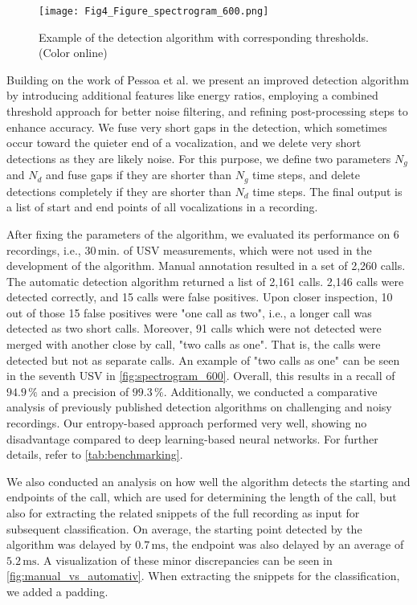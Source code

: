 \documentclass[preprint,NumberedRefs]{JASA}
\begin{document}
\begin{figure}[ht]
    \begin{center}
    \texttt{[image: Fig4\_Figure\_spectrogram\_600.png]}
    \caption{\label{fig:spectrogram_600}{Example of the detection algorithm with corresponding thresholds. (Color online)}}
    \end{center}
\end{figure}

Building on the work of Pessoa et al. we present an improved detection algorithm by introducing additional features like energy ratios, employing a combined threshold approach for better noise filtering, and refining post-processing steps to enhance accuracy. We fuse very short gaps in the detection, which sometimes occur toward the quieter end of a vocalization, and we delete very short detections as they are likely noise. For this purpose, we define two parameters $N_{g}$ and $N_{d}$ and fuse gaps if they are shorter than $N_{g}$ time steps, and delete detections completely if they are shorter than $N_{d}$ time steps. The final output is a list of start and end points of all vocalizations in a recording.

After fixing the parameters of the algorithm, we evaluated its performance on 6 recordings, i.e., \(30\,\mathrm{min.}\) of USV measurements, which were not used in the development of the algorithm. Manual annotation resulted in a set of 2,260 calls. The automatic detection algorithm returned a list of 2,161 calls. 2,146 calls were detected correctly, and 15 calls were false positives. Upon closer inspection, 10 out of those 15 false positives were "one call as two", i.e., a longer call was detected as two short calls. Moreover, 91 calls which were not detected were merged with another close by call, "two calls as one". That is, the calls were detected but not as separate calls. An example of "two calls as one" can be seen in the seventh USV in \autoref{fig:spectrogram_600}. Overall, this results in a recall of \(94.9\,\mathrm{\%} \) and a precision of \(99.3\,\mathrm{\%} \). Additionally, we conducted a comparative analysis of previously published detection algorithms on challenging and noisy recordings. Our entropy-based approach performed very well, showing no disadvantage compared to deep learning-based neural networks. For further details, refer to \autoref{tab:benchmarking}.

We also conducted an analysis on how well the algorithm detects the starting and endpoints of the call, which are used for determining the length of the call, but also for extracting the related snippets of the full recording as input for subsequent classification. On average, the starting point detected by the algorithm was delayed by \(0.7\,\mathrm{ms} \), the endpoint was also delayed by an average of \(5.2\,\mathrm{ms} \). A visualization of these minor discrepancies can be seen in \autoref{fig:manual_vs_automativ}. When extracting the snippets for the classification, we added a padding.
\end{document}
